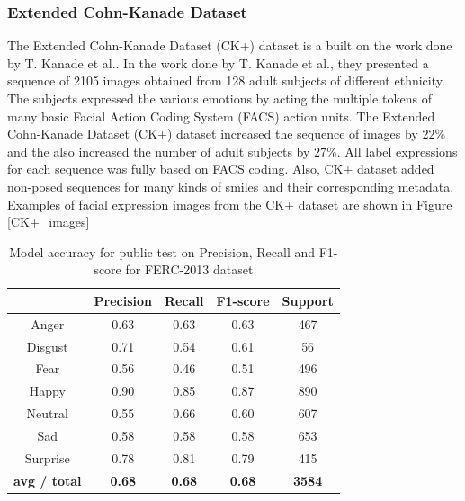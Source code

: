\documentclass[master]{thesis-uestc}
\begin{document}
\subsubsection{Extended Cohn-Kanade Dataset}
The Extended Cohn-Kanade Dataset (CK+) dataset is a built on the work done by T. Kanade et al.. In the work done by T. Kanade et al., they presented a sequence of 2105 images obtained from 128 adult subjects of different ethnicity. The subjects expressed the various emotions by acting the multiple tokens of many basic Facial Action Coding System (FACS) action units. The Extended Cohn-Kanade Dataset (CK+) dataset increased the sequence of images by $22\%$ and the also increased the number of adult subjects by $27\%$. All label expressions for each sequence was fully based on FACS coding. Also, CK+ dataset added non-posed sequences for many kinds of smiles and their corresponding metadata. Examples of facial expression images from the CK+ dataset are shown in Figure \ref{CK+_images}

\begin{table}[ht]
\renewcommand{\arraystretch}{1.3}
\caption{Model accuracy for public test on Precision, Recall and F1-score for FERC-2013 dataset}
\label{table_fer2013_scores_public}
\begin{center}
\begin{tabular}{|c|c|c|c|c|}

\hline
 & Precision & Recall & F1-score & Support\\ \hline

Anger & 0.63 & 0.63 & 0.63 & 467\\ \hline
Disgust & 0.71 & 0.54 & 0.61 & 56\\ \hline
Fear & 0.56 & 0.46 & 0.51 & 496\\ \hline
Happy & 0.90 & 0.85 & 0.87 & 890\\ \hline
Neutral & 0.55 & 0.66 & 0.60 & 607\\ \hline
Sad & 0.58 & 0.58 & 0.58 & 653\\ \hline
Surprise & 0.78 & 0.81 & 0.79 & 415\\ \hline

\textbf{avg / total} & \textbf{0.68} & \textbf{0.68} & \textbf{0.68} & \textbf{3584}\\ \hline

\end{tabular}
\end{center}
\end{table}
\end{document}

